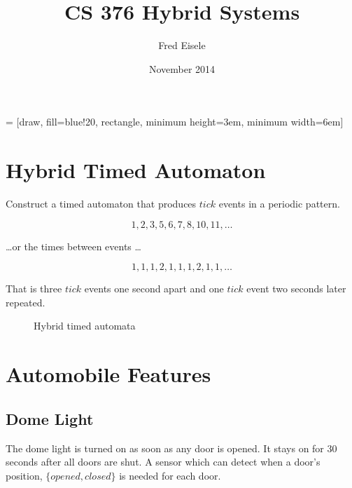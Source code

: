 \documentclass{article}
\title{CS 376 Hybrid Systems}
\author{Fred Eisele}
\date{November 2014}
\begin{document}
\maketitle

 = [draw, fill=blue!20, rectangle, 
    minimum height=3em, minimum width=6em]


\section{Hybrid Timed Automaton}
Construct a timed automaton that produces $tick$
events in a periodic pattern.

\begin{equation}
1, 2, 3, 5, 6, 7 ,8, 10, 11, \ldots
\end{equation}

\ldots or the times between events \ldots

\begin{equation}
1, 1, 1, 2, 1, 1, 1, 2, 1, 1, \ldots
\end{equation}

That is three $tick$ events one second apart
and one $tick$ event two seconds later repeated.

\begin{figure}[h!]

\caption{Hybrid timed automata}
\label{fig:time_automata}
\end{figure}

\section{Automobile Features}

\subsection{Dome Light}
The dome light is turned on as soon as any door
is opened.
It stays on for 30 seconds after all doors are shut.
A sensor which can detect when a door's position, 
$\{opened, closed\}$ is needed for each door.
\end{document}
